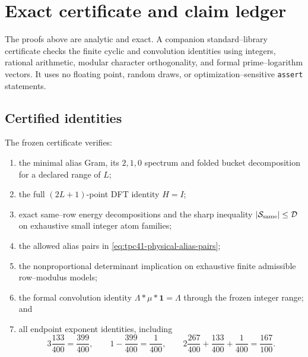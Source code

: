 \section{Exact certificate and claim ledger}
\label{sec:tpc41-certificate}

The proofs above are analytic and exact.  A companion standard--library
certificate checks the finite cyclic and convolution identities using
integers, rational arithmetic, modular character orthogonality, and formal
prime--logarithm vectors.  It uses no floating point, random draws, or
optimization--sensitive \texttt{assert} statements.

\subsection{Certified identities}

The frozen certificate verifies:
\begin{enumerate}[label=(\roman*)]
 \item the minimal alias Gram, its \(2,1,0\) spectrum and folded bucket
 decomposition for a declared range of \(L\);
 \item the full \((2L+1)\)-point DFT identity \(H=I\);
 \item exact same--row energy decompositions and the sharp inequality
 \(|\mathcal S_{\rm same}|\le\mathcal D\) on exhaustive small integer atom families;
 \item the allowed alias pairs in
 \eqref{eq:tpc41-physical-alias-pairs};
 \item the nonproportional determinant implication on exhaustive finite
 admissible row--modulus models;
 \item the formal convolution identity
 \(\Lambda*\mu*\mathbf1=\Lambda\) through the frozen integer range; and
 \item all endpoint exponent identities, including
 \begin{equation}
  3\frac{133}{400}=\frac{399}{400},
  \qquad
  1-\frac{399}{400}=\frac1{400},
  \qquad
  2\frac{267}{400}+\frac{133}{400}+\frac1{400}
  =\frac{167}{100}.
  \label{eq:tpc41-certificate-exponents}
 \end{equation}
\end{enumerate}

